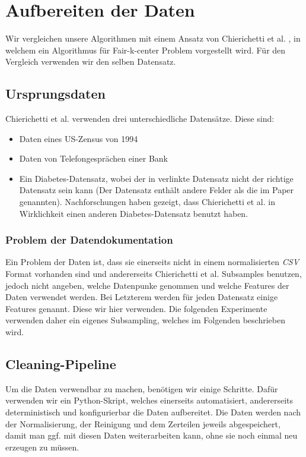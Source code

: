 
\chapter{Aufbereiten der Daten} \label{chap:Daten}

    Wir vergleichen unsere Algorithmen mit einem Ansatz von Chierichetti et al. \cite{chierichetti2018fair}, in welchem ein Algorithmus für Fair-k-center Problem vorgestellt wird. Für den Vergleich verwenden wir den selben Datensatz.

\section{Ursprungsdaten}
    Chierichetti et al. \cite{chierichetti2018fair} verwenden drei unterschiedliche Datensätze. Diese sind:
    \begin{itemize}
        \item Daten eines US-Zensus von 1994 \cite{misc_adult_2}
        \item Daten von Telefongesprächen einer Bank \cite{misc_bank_marketing_222}
        \item Ein Diabetes-Datensatz, wobei der in \cite{chierichetti2018fair} verlinkte Datensatz \cite{misc_diabetes_34_falsch} nicht der richtige Datensatz sein kann (Der Datensatz enthält andere Felder als die im Paper genannten). Nachforschungen haben gezeigt, dass Chierichetti et al. in Wirklichkeit einen anderen Diabetes-Datensatz \cite{misc_diabetes_130_richtig} benutzt haben.
    \end{itemize}

    \subsection{Problem der Datendokumentation}
        Ein Problem der Daten ist, dass sie einerseits nicht in einem normalisierten \textit{CSV} Format vorhanden sind und andererseits Chierichetti et al. \cite{chierichetti2018fair} Subsamples benutzen, jedoch nicht angeben, welche Datenpunke genommen und welche Features der Daten verwendet werden. Bei Letzterem werden für jeden Datensatz einige Features genannt. Diese wir hier verwenden. Die folgenden Experimente verwenden daher ein eigenes Subsampling, welches im Folgenden beschrieben wird.

\section{Cleaning-Pipeline}
    Um die Daten verwendbar zu machen, benötigen wir einige Schritte. Dafür verwenden wir ein Python-Skript, welches einerseits automatisiert, andererseits deterministisch und konfigurierbar die Daten aufbereitet. Die Daten werden nach der Normalisierung, der Reinigung und dem Zerteilen jeweils abgespeichert, damit man ggf. mit diesen Daten weiterarbeiten kann, ohne sie noch einmal neu erzeugen zu müssen.
    
